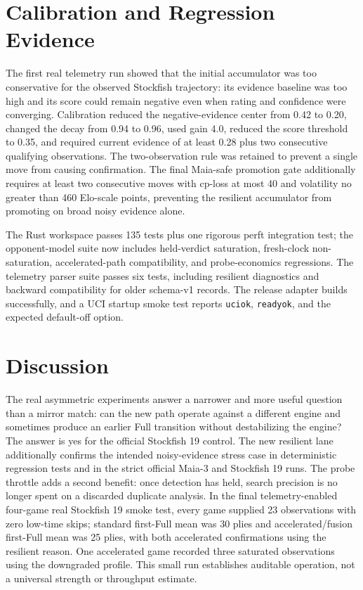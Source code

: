 \documentclass[conference]{IEEEtran}
\begin{document}
\section{Calibration and Regression Evidence}
The first real telemetry run showed that the initial accumulator was too conservative for the observed Stockfish trajectory: its evidence baseline was too high and its score could remain negative even when rating and confidence were converging. Calibration reduced the negative-evidence center from 0.42 to 0.20, changed the decay from 0.94 to 0.96, used gain 4.0, reduced the score threshold to 0.35, and required current evidence of at least 0.28 plus two consecutive qualifying observations. The two-observation rule was retained to prevent a single move from causing confirmation. The final Maia-safe promotion gate additionally requires at least two consecutive moves with cp-loss at most 40 and volatility no greater than 460 Elo-scale points, preventing the resilient accumulator from promoting on broad noisy evidence alone.

The Rust workspace passes 135 tests plus one rigorous perft integration test; the opponent-model suite now includes held-verdict saturation, fresh-clock non-saturation, accelerated-path compatibility, and probe-economics regressions. The telemetry parser suite passes six tests, including resilient diagnostics and backward compatibility for older schema-v1 records. The release adapter builds successfully, and a UCI startup smoke test reports \texttt{uciok}, \texttt{readyok}, and the expected default-off option.

\section{Discussion}
The real asymmetric experiments answer a narrower and more useful question than a mirror match: can the new path operate against a different engine and sometimes produce an earlier Full transition without destabilizing the engine? The answer is yes for the official Stockfish 19 control. The new resilient lane additionally confirms the intended noisy-evidence stress case in deterministic regression tests and in the strict official Maia-3 and Stockfish 19 runs. The probe throttle adds a second benefit: once detection has held, search precision is no longer spent on a discarded duplicate analysis. In the final telemetry-enabled four-game real Stockfish 19 smoke test, every game supplied 23 observations with zero low-time skips; standard first-Full mean was 30 plies and accelerated/fusion first-Full mean was 25 plies, with both accelerated confirmations using the resilient reason. One accelerated game recorded three saturated observations using the downgraded profile. This small run establishes auditable operation, not a universal strength or throughput estimate.
\end{document}
